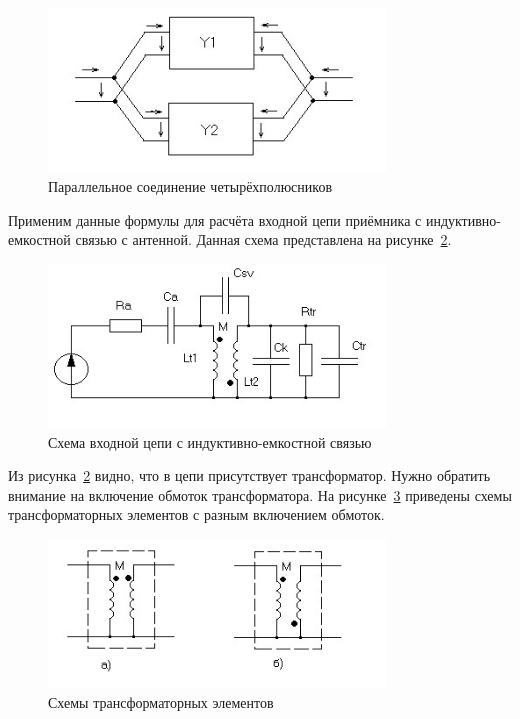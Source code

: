 \begin{figure}[H] \centering
  \includegraphics[width=0.8\textwidth]{./content/RIs009.jpg}
  \caption{Параллельное соединение четырёхполюсников} \label{p:RIs009}
\end{figure}


Применим  данные  формулы  для  расчёта  входной  цепи  приёмника  с индуктивно-емкостной  связью  с  антенной.  Данная  схема  представлена  на рисунке~\ref{p:RIs010}. 


\begin{figure}[H] \centering
  \includegraphics[width=0.8\textwidth]{./content/RIs010.jpg}
  \caption{Схема входной цепи с индуктивно-емкостной связью} \label{p:RIs010}
\end{figure}


Из рисунка~\ref{p:RIs010} видно, что в цепи присутствует трансформатор. Нужно обратить  внимание  на  включение  обмоток  трансформатора.  На  рисунке~\ref{p:RIs011} приведены  схемы  трансформаторных  элементов  с  разным  включением обмоток. 


\begin{figure}[H] \centering
  \includegraphics[width=0.8\textwidth]{./content/RIs011.jpg}
  \caption{Схемы трансформаторных элементов} \label{p:RIs011}
\end{figure}

